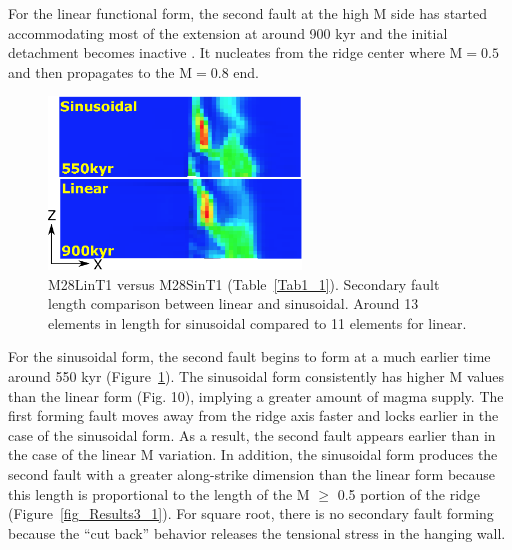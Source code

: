 For the linear functional form, the second fault  at the high M side has started accommodating most of the extension at around 900 kyr and the initial detachment becomes inactive . It nucleates from the ridge center where M$=0.5$ and then propagates to the M$=0.8$ end. %

\begin{figure}[h]
  \centering
    \includegraphics[width=0.6\textwidth]{./Figures/fig_Results4_2_secondary_fault_length_comparison.eps}
  \caption{M28LinT1 versus M28SinT1 (Table~\hyperref[Tab1_1]{\ref{Tab1_1}}). Secondary fault length comparison between linear and sinusoidal. Around 13 elements in length for sinusoidal compared to 11 elements for linear.}
 \label{fig_Results4_2}
\end{figure}   

For the sinusoidal form, the second fault begins to form at a much earlier time around 550 kyr (Figure~\hyperref[fig_Results4_2]{\ref{fig_Results4_2}}). The sinusoidal form consistently has higher M values than the linear form (Fig. 10), implying a greater amount of magma supply. %
The first forming fault moves away from the ridge axis faster and locks earlier in the case of the sinusoidal form. As a result, the second fault appears earlier than in the case of the linear M variation. In addition, the sinusoidal form produces the second fault with a greater along-strike dimension than the linear form because this length is proportional to the length of the M $\ge$ 0.5 portion of the ridge (Figure~\hyperref[fig_Results3_1]{\ref{fig_Results3_1}}). 
For square root, there is no secondary fault forming because the ``cut back'' behavior releases the tensional stress in the hanging wall.

